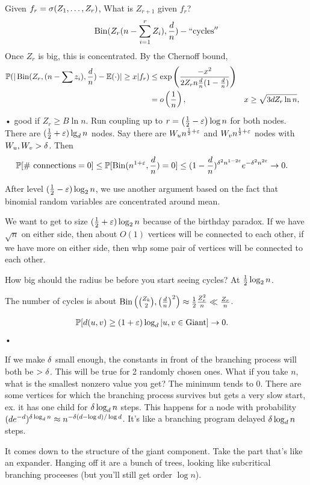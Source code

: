 Given $f_r = \sigma(Z_1,\ldots, Z_r)$, What is $Z_{r+1}$ given $f_r$? 
\begin{align}
\operatorname{Bin}(Z_r (n-\sum_{i=1}^{r} Z_i ),\frac{d}{n}) - ``\text{cycles}''
\end{align}
Once $Z_r$ is big, this is concentrated. 
By the Chernoff bound,
\begin{align}
\mathbb{P}(|\operatorname{Bin}(Z_r,(n-\sum z_i), \frac{d}{n})- \mathbb{E}(\cdot)|\ge x|f_r)
&\le \exp\left( {\frac{-x^2}{2Z_r n \frac{d}{n} (1-\frac{d}{n})}} \right)\\
&= o\left( {\frac{1}{n}} \right), &x &\ge \sqrt{3d Z_r \ln n},
\end{align}•
good if $Z_r \ge B\ln n$. 
Run coupling up to $r=\left( {\frac{1}{2} - \varepsilon} \right)\log n$ for both nodes. There are $(\frac{1}{2} + \varepsilon) \lg_d n$ nodes. Say there are $W_u n^{\frac{1}{2}+ \varepsilon}$ and $W_v n^{\frac{1}{2}+\varepsilon}$ nodes with $W_u,W_v>\delta$. 
Then
\begin{align}
\mathbb{P}[\#\text{ connections}=0] &\le \mathbb{P}[\operatorname{Bin}(n^{1+\varepsilon},\frac{d}{n})=0]\le 
(1-\frac{d}{n})^{\delta^{2} n^{1-2\varepsilon}}
e^{-\delta^2 n^{2\varepsilon}}\to 0.
\end{align}

After level $(\frac{1}{2} -\varepsilon)\log_2 n$, we use another argument based on the fact that binomial random variables are concentrated around mean.

We want to get to size $(\frac{1}{2}+\varepsilon)\log_2n$ because of the birthday paradox. If we have $\sqrt n$ on either side, then about $O(1)$ vertices will be connected to each other, if we have more on either side, then whp some pair of vertices will be connected to each other.

How big should the radius be before you start seeing cycles? At $\frac{1}{2} \log_2 n$. 

The number of cycles is about $\operatorname{Bin}\left( {\binom{Z_k}2, \left( {\frac{d}{n}} \right)^2} \right)\approx \frac{1}{2} \frac{Z_r^2}{n}\ll \frac{Z_r}{n}$.

\begin{align}
\mathbb{P}[d(u,v)\ge (1+\varepsilon)\log_d|u,v\in\text{Giant}]&\to 0.
\end{align}•

If we make $\delta$ small enough, the constants in front of the branching process will both be $>\delta$. This will be true for 2 randomly chosen ones. What if you take $n$, what is the smallest nonzero value you get? The minimum tends to 0. 
There are some vertices for which the branching process survives but gets a very slow start, ex. it has one child for $\delta \log_d n$ steps.
This happens for a node with probability $(de^{-d})^{\delta \log_d n} \approx n^{-\delta(d-\log d)/\log d}$. %
It's like a branching program delayed
$\delta \log_d n$ steps.

It comes down to the structure of the giant component. Take the part that's like an expander. Hanging off it are a bunch of trees, looking like subcritical branching proceeses (but you'll still get order $\log n$).%

